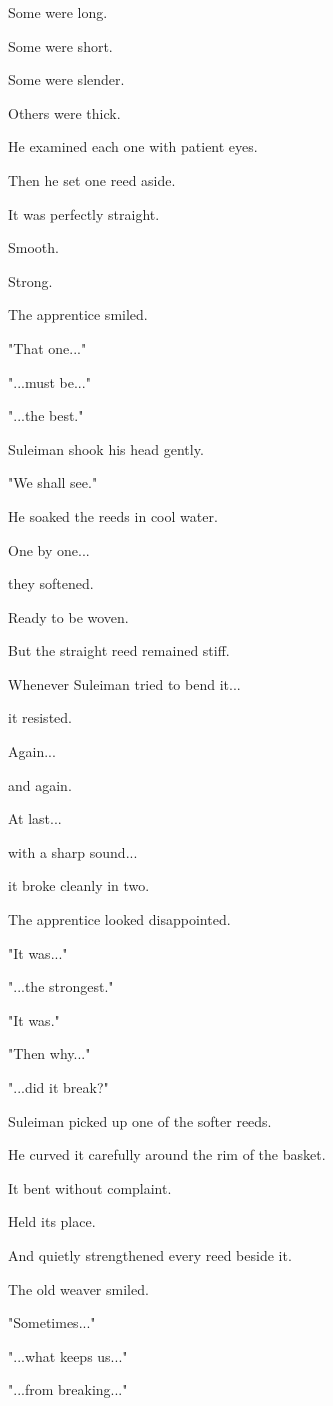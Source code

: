 \documentclass[12pt,openany]{book}
\begin{document}
Some were long.

Some were short.

Some were slender.

Others were thick.

He examined each one with patient eyes.

Then he set one reed aside.

It was perfectly straight.

Smooth.

Strong.

The apprentice smiled.

"That one..."

"...must be..."

"...the best."

Suleiman shook his head gently.

"We shall see."

He soaked the reeds in cool water.

One by one...

they softened.

Ready to be woven.

But the straight reed remained stiff.

Whenever Suleiman tried to bend it...

it resisted.

Again...

and again.

At last...

with a sharp sound...

it broke cleanly in two.

The apprentice looked disappointed.

"It was..."

"...the strongest."

"It was."

"Then why..."

"...did it break?"

Suleiman picked up one of the softer reeds.

He curved it carefully around the rim of the basket.

It bent without complaint.

Held its place.

And quietly strengthened every reed beside it.

The old weaver smiled.

"Sometimes..."

"...what keeps us..."

"...from breaking..."
\end{document}
